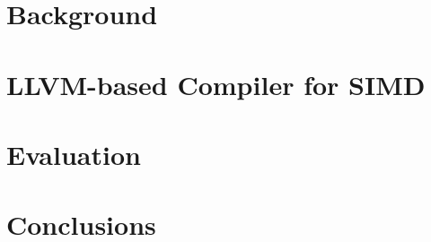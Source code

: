\documentclass[a4paper,10pt,twoside]{report}
\begin{document}

\chapter{Background}\label{chapter:background}



%

\chapter{LLVM-based Compiler for SIMD}\label{chapter:compiler}



%


\chapter{Evaluation}\label{chapter:evaluation}



\chapter{Conclusions}\label{chapter:conclusion}



%				
\end{document}
